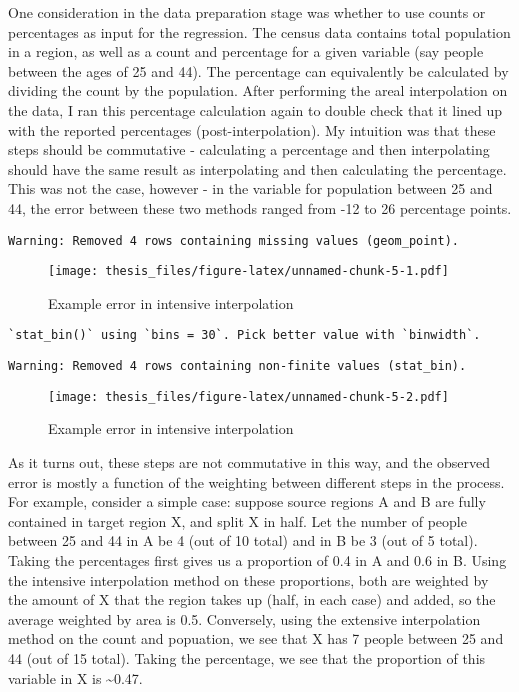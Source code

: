 \documentclass[12pt,twoside]{reedthesis}
\theoremstyle{definition}
\theoremstyle{definition}
\theoremstyle{definition}
\theoremstyle{remark}
\begin{document}
One consideration in the data preparation stage was whether to use
counts or percentages as input for the regression. The census data
contains total population in a region, as well as a count and percentage
for a given variable (say people between the ages of 25 and 44). The
percentage can equivalently be calculated by dividing the count by the
population. After performing the areal interpolation on the data, I ran
this percentage calculation again to double check that it lined up with
the reported percentages (post-interpolation). My intuition was that
these steps should be commutative - calculating a percentage and then
interpolating should have the same result as interpolating and then
calculating the percentage. This was not the case, however - in the
variable for population between 25 and 44, the error between these two
methods ranged from -12 to 26 percentage points.
\begin{verbatim}
Warning: Removed 4 rows containing missing values (geom_point).
\end{verbatim}
\begin{figure}
\centering
\texttt{[image: thesis\_files/figure-latex/unnamed-chunk-5-1.pdf]}
\caption{\label{fig:unnamed-chunk-5}Example error in intensive
interpolation}
\end{figure}
\begin{verbatim}
`stat_bin()` using `bins = 30`. Pick better value with `binwidth`.
\end{verbatim}
\begin{verbatim}
Warning: Removed 4 rows containing non-finite values (stat_bin).
\end{verbatim}
\begin{figure}
\centering
\texttt{[image: thesis\_files/figure-latex/unnamed-chunk-5-2.pdf]}
\caption{\label{fig:unnamed-chunk-5}Example error in intensive
interpolation}
\end{figure}
As it turns out, these steps are not commutative in this way, and the
observed error is mostly a function of the weighting between different
steps in the process. For example, consider a simple case: suppose
source regions A and B are fully contained in target region X, and split
X in half. Let the number of people between 25 and 44 in A be 4 (out of
10 total) and in B be 3 (out of 5 total). Taking the percentages first
gives us a proportion of 0.4 in A and 0.6 in B. Using the intensive
interpolation method on these proportions, both are weighted by the
amount of X that the region takes up (half, in each case) and added, so
the average weighted by area is 0.5. Conversely, using the extensive
interpolation method on the count and popuation, we see that X has 7
people between 25 and 44 (out of 15 total). Taking the percentage, we
see that the proportion of this variable in X is \textasciitilde{}0.47.
\end{document}
